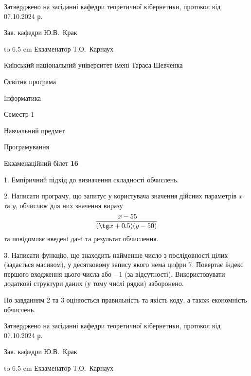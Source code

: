 \documentclass[12pt, ukrainian]{article}
\begin{document}
{\smallskip\smallskip \begin {scriptsize} Затверджено на засіданні кафедри теоретичної кібернетики, протокол   від   07.10.2024 р.\par\smallskip\smallskip\smallskip\smallskip
{\parbox {6.5 cm} {Зав. кафедри \dotfill Ю.В.~Крак}}\hspace {0.7cm} {\hbox to 6.5 cm { Екзаменатор \dotfill Т.О.~Карнаух}} \end{scriptsize}}
\newpage
{{\begin {scriptsize}\par
{ \center  Київський національний університет імені Тараса Шевченка \par}
{\parbox {5 cm}{Освітня програма \hfill}{\parbox {7 cm}{Інформатика\hfill}}\parbox {6 cm}{\hfill Семестр 1}}\par
{\parbox {5 cm} {Навчальний предмет \hfill}\parbox {7 cm}{Програмування \hfill}\parbox {6cm}{\hfill}\par}\vspace{-15pt} \end{scriptsize}}{\center Екзаменаційний білет \No \textbf { 16 }\par}}
{%
1. Емпіричний підхід до визначення складності обчислень.%
\par
2. Написати програму, що запитує у користувача значення дійсних параметрів $x$ та $y$, обчислює для них значення виразу 
$$\frac{\ x - 55}{(\tg x + 0.5) (y - 50)}$$ 
та повiдомляє введенi данi та результат обчислення.

\par
3. Написати функцію, що знаходить найменше число з послідовності цілих (задається масивом), у десятковому запису якого нема цифри 7. Повертає індекс першого входження цього числа або $-1$ (за відсутності). Використовувати додаткові структури даних (у тому числі рядки) заборонено.

По завданням 2 та 3 оцінюється правильність та якість коду, а також економність обчислень.

}
{\smallskip\smallskip \begin {scriptsize} Затверджено на засіданні кафедри теоретичної кібернетики, протокол   від   07.10.2024 р.\par\smallskip\smallskip\smallskip\smallskip
{\parbox {6.5 cm} {Зав. кафедри \dotfill Ю.В.~Крак}}\hspace {0.7cm} {\hbox to 6.5 cm { Екзаменатор \dotfill Т.О.~Карнаух}} \end{scriptsize}}
\vspace{0.9cm}
\end{document}
